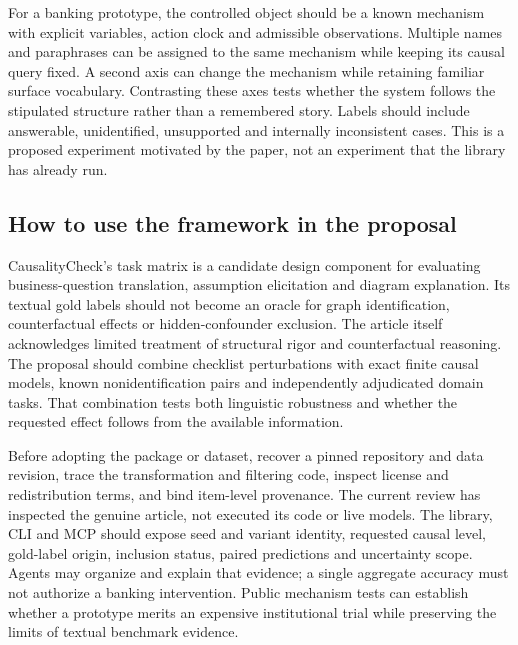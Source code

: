 For a banking prototype, the controlled object should be a known mechanism with explicit variables, action clock and admissible observations. Multiple names and paraphrases can be assigned to the same mechanism while keeping its causal query fixed. A second axis can change the mechanism while retaining familiar surface vocabulary. Contrasting these axes tests whether the system follows the stipulated structure rather than a remembered story. Labels should include answerable, unidentified, unsupported and internally inconsistent cases. This is a proposed experiment motivated by the paper, not an experiment that the library has already run.

\subsection{How to use the framework in the proposal}
\label{exec21:check-integration}
CausalityCheck's task matrix is a candidate design component for evaluating business-question translation, assumption elicitation and diagram explanation. Its textual gold labels should not become an oracle for graph identification, counterfactual effects or hidden-confounder exclusion. The article itself acknowledges limited treatment of structural rigor and counterfactual reasoning. The proposal should combine checklist perturbations with exact finite causal models, known nonidentification pairs and independently adjudicated domain tasks. That combination tests both linguistic robustness and whether the requested effect follows from the available information.~\citep{exec21_causalitycheck}

Before adopting the package or dataset, recover a pinned repository and data revision, trace the transformation and filtering code, inspect license and redistribution terms, and bind item-level provenance. The current review has inspected the genuine article, not executed its code or live models. The library, CLI and MCP should expose seed and variant identity, requested causal level, gold-label origin, inclusion status, paired predictions and uncertainty scope. Agents may organize and explain that evidence; a single aggregate accuracy must not authorize a banking intervention. Public mechanism tests can establish whether a prototype merits an expensive institutional trial while preserving the limits of textual benchmark evidence.
